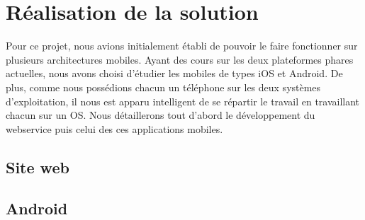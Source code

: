 \cleardoublepage



\chapter{Réalisation de la solution}

Pour ce projet, nous avions initialement établi de pouvoir le faire fonctionner sur plusieurs architectures mobiles.
Ayant des cours sur les deux plateformes phares actuelles, nous avons choisi d'étudier les mobiles de types iOS et Android.
De plus, comme nous possédions chacun un téléphone sur les deux systèmes d'exploitation, il nous est apparu intelligent de se répartir le travail en travaillant chacun sur un OS.
Nous détaillerons tout d'abord le développement du webservice puis celui des ces applications mobiles.






\section{Site web}








\section{Android}







